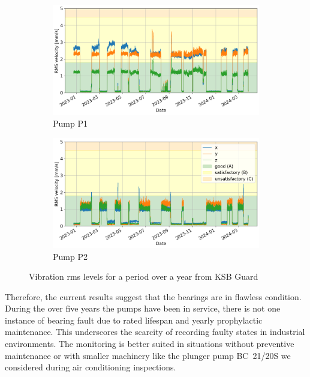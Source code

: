 \begin{figure}[h]
    \centering
    \begin{subfigure}[b]{0.49\textwidth}
        \includegraphics[width=\textwidth]{assets/results/ksb-cloud/p1.png}
        \caption{Pump P1}
    \end{subfigure}
    \hfill
    \begin{subfigure}[b]{0.49\textwidth}
        \includegraphics[width=\textwidth]{assets/results/ksb-cloud/p2.png}
        \caption{Pump P2}
    \end{subfigure}
    \caption{Vibration rms levels for a period over a year from KSB Guard}
    \label{fig:evaluation:ksb-guard-rms-vibartions}
\end{figure} 

Therefore, the current results suggest that the bearings are in flawless condition. During the over five years the pumps have been in service, there is not one instance of bearing fault due to rated lifespan and yearly prophylactic maintenance. This underscores the scarcity of recording faulty states in industrial environments. The monitoring is better suited in situations without preventive maintenance or with smaller machinery like the plunger pump BC~21/20S we considered during air conditioning inspections.

